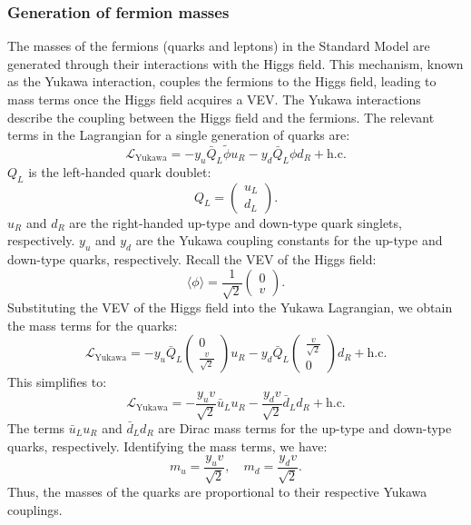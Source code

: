         \subsubsection{Generation of fermion masses}
            The masses of the fermions (quarks and leptons) in the Standard Model 
            are generated through their interactions with the Higgs field. This 
            mechanism, known as the Yukawa interaction, couples the fermions to 
            the Higgs field, leading to mass terms once the Higgs field acquires 
            a VEV. 
            The Yukawa interactions describe the coupling between the Higgs field and
            the fermions. The relevant terms in the Lagrangian for a single generation 
            of quarks are:
            \[
            \mathcal{L}_{\text{Yukawa}} = -y_u \bar{Q}_L \tilde{\phi} u_R - y_d \bar{Q}_L \phi d_R + \text{h.c.}
            \]
            \(Q_L\) is the left-handed quark doublet:
            \[
            Q_L = \begin{pmatrix} u_L \\ d_L \end{pmatrix}.
            \]
            \(u_R\) and \(d_R\) are the right-handed up-type and down-type quark singlets, respectively.
            \(y_u\) and \(y_d\) are the Yukawa coupling constants for the up-type and down-type quarks, respectively.
            Recall the VEV of the Higgs field:
            \[
            \langle \phi \rangle = \frac{1}{\sqrt{2}} \begin{pmatrix} 0 \\ v \end{pmatrix}.
            \]
            Substituting the VEV of the Higgs field into the Yukawa Lagrangian, we obtain the mass terms for the quarks:
            \[
            \mathcal{L}_{\text{Yukawa}} = -y_u \bar{Q}_L \begin{pmatrix} 0 \\ \frac{v}{\sqrt{2}} \end{pmatrix} u_R - y_d \bar{Q}_L \begin{pmatrix} \frac{v}{\sqrt{2}} \\ 0 \end{pmatrix} d_R + \text{h.c.}
            \]
            This simplifies to:
            \[
            \mathcal{L}_{\text{Yukawa}} = -\frac{y_u v}{\sqrt{2}} \bar{u}_L u_R - \frac{y_d v}{\sqrt{2}} \bar{d}_L d_R + \text{h.c.}
            \]
            The terms \(\bar{u}_L u_R\) and \(\bar{d}_L d_R\) are Dirac mass terms for the up-type and down-type quarks, 
            respectively. Identifying the mass terms, we have:
            \[
            m_u = \frac{y_u v}{\sqrt{2}}, \quad m_d = \frac{y_d v}{\sqrt{2}}.
            \]
            Thus, the masses of the quarks are proportional to their respective Yukawa couplings.

